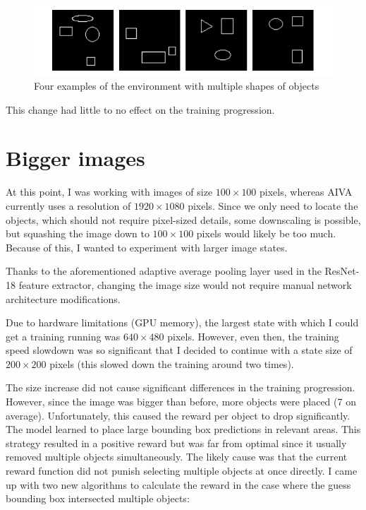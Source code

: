 \documentclass[
  digital,     %
  oneside,     %
  nosansbold,  %
  nocolorbold, %
  lof,         %
  lot,         %
]{fithesis4}
\begin{document}
\begin{figure}
    \centering
    \includegraphics[width=1\linewidth]{env_examples/env5.pdf}
    \caption{Four examples of the environment with multiple shapes of objects}
    \label{fig:env5}
\end{figure}
 
This change had little to no effect on the training progression.

\section{Bigger images}
At this point, I was working with images of size $100\times100$ pixels, whereas AIVA currently uses a resolution of $1920\times1080$ pixels. Since we only need to locate the objects, which should not require pixel-sized details, some downscaling is possible, but squashing the image down to $100\times100$ pixels would likely be too much. Because of this, I wanted to experiment with larger image states.

Thanks to the aforementioned adaptive average pooling layer used in the ResNet-18 feature extractor, changing the image size would not require manual network architecture modifications.

Due to hardware limitations (GPU memory), the largest state with which I could get a training running was $640\times480$ pixels. However, even then, the training speed slowdown was so significant that I decided to continue with a state size of $200\times200$ pixels (this slowed down the training around two times).

The size increase did not cause significant differences in the training progression. However, since the image was bigger than before, more objects were placed (7 on average). Unfortunately, this caused the reward per object to drop significantly. The model learned to place large bounding box predictions in relevant areas. This strategy resulted in a positive reward but was far from optimal since it usually removed multiple objects simultaneously. The likely cause was that the current reward function did not punish selecting multiple objects at once directly. I came up with two new algorithms to calculate the reward in the case where the guess bounding box intersected multiple objects:
\end{document}
